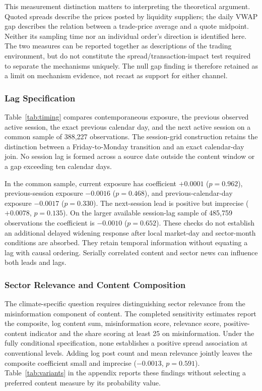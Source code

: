 \documentclass{article}
\theoremstyle{plain}
\begin{document}
This measurement distinction matters to interpreting the theoretical argument. Quoted spreads describe the prices posted by liquidity suppliers; the daily VWAP gap describes the relation between a trade-price average and a quote midpoint. Neither its sampling time nor an individual order's direction is identified here. The two measures can be reported together as descriptions of the trading environment, but do not constitute the spread/transaction-impact test required to separate the mechanisms uniquely. The null gap finding is therefore retained as a limit on mechanism evidence, not recast as support for either channel.

\subsubsection{Lag Specification}
\label{sec:results_lag}
Table~\ref{tab:timing} compares contemporaneous exposure, the previous observed active session, the exact previous calendar day, and the next active session on a common sample of 388,227 observations. The session-grid construction retains the distinction between a Friday-to-Monday transition and an exact calendar-day join. No session lag is formed across a source date outside the content window or a gap exceeding ten calendar days.



In the common sample, current exposure has coefficient $+0.0001$ ($p=0.962$), previous-session exposure $-0.0016$ ($p=0.468$), and previous-calendar-day exposure $-0.0017$ ($p=0.330$). The next-session lead is positive but imprecise ($+0.0078$, $p=0.135$). On the larger available session-lag sample of 485,759 observations the coefficient is $-0.0010$ ($p=0.652$). These checks do not establish an additional delayed widening response after local market-day and sector-month conditions are absorbed. They retain temporal information without equating a lag with causal ordering. Serially correlated content and sector news can influence both leads and lags.

\subsubsection{Sector Relevance and Content Composition}
\label{sec:results_placebo}
The climate-specific question requires distinguishing sector relevance from the misinformation component of content. The completed sensitivity estimates report the composite, log content sum, misinformation score, relevance score, positive-content indicator and the share scoring at least 25 on misinformation. Under the fully conditional specification, none establishes a positive spread association at conventional levels. Adding log post count and mean relevance jointly leaves the composite coefficient small and imprecise ($-0.0013$, $p=0.591$). Table~\ref{tab:variants} in the appendix reports these findings without selecting a preferred content measure by its probability value.
\end{document}
